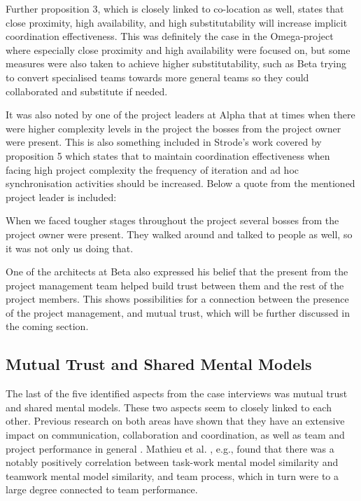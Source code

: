Further proposition 3, which is closely linked to co-location as well, states that close proximity, high availability, and high substitutability will increase implicit coordination effectiveness. This was definitely the case in the Omega-project where especially close proximity and high availability were focused on, but some measures were also taken to achieve higher substitutability, such as Beta trying to convert specialised teams towards more general teams so they could collaborated and substitute if needed.

It was also noted by one of the project leaders at Alpha that at times when there were higher complexity levels in the project the bosses from the project owner were present. This is also something included in Strode's work covered by proposition 5 which states that to maintain coordination effectiveness when facing high project complexity the frequency of iteration and ad hoc synchronisation activities should be increased. Below a quote from the mentioned project leader is included:

\begin{fancyquotes}
When we faced tougher stages throughout the project several bosses from the project owner were present. They walked around and talked to people as well, so it was not only us doing that.
\end{fancyquotes}

One of the architects at Beta also expressed his belief that the present from the project management team helped build trust between them and the rest of the project members. This shows possibilities for a connection between the presence of the project management, and mutual trust, which will be further discussed in the coming section.

\subsection{Mutual Trust and Shared Mental Models}
\label{mtasmm}

The last of the five identified aspects from the case interviews was mutual trust and shared mental models. These two aspects seem to closely linked to each other. Previous research on both areas have shown that they have an extensive impact on communication, collaboration and coordination, as well as team and project performance in general \cite{bandow, salas, cooper, mathieu}. Mathieu et al. \cite{}, e.g., found that there was a notably positively correlation between task-work mental model similarity and teamwork mental model similarity, and team process, which in turn were to a large degree connected to team performance.

